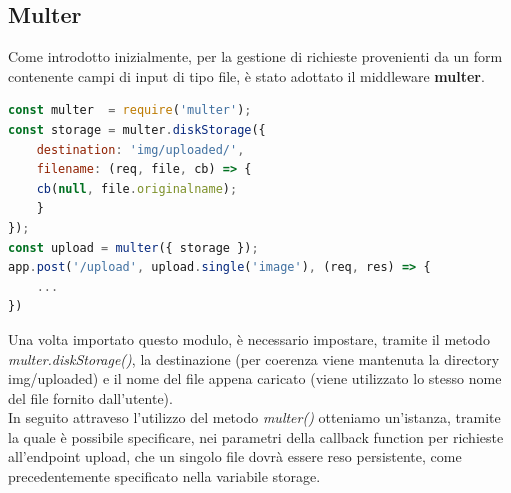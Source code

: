 \subsection{Multer}
Come introdotto inizialmente, per la gestione di richieste provenienti da un form contenente campi di input di tipo file, è stato adottato il middleware \textbf{multer}.
\begin{lstlisting}[language=Javascript, caption={Configurazione upload immagine}, showstringspaces=false]
const multer  = require('multer');
const storage = multer.diskStorage({
    destination: 'img/uploaded/',
    filename: (req, file, cb) => {
    cb(null, file.originalname);
    }
});
const upload = multer({ storage });
app.post('/upload', upload.single('image'), (req, res) => {
    ...
})
\end{lstlisting}
Una volta importato questo modulo, è necessario impostare, tramite il metodo \emph{multer.diskStorage()}, la destinazione (per coerenza viene mantenuta la directory img/uploaded) e il nome del file appena caricato (viene utilizzato lo stesso nome del file fornito dall'utente).
\\In seguito attraveso l'utilizzo del metodo \emph{multer()} otteniamo un'istanza, tramite la quale è possibile specificare, nei parametri della callback function per richieste all'endpoint upload, che un singolo file dovrà essere reso persistente, come precedentemente specificato nella variabile storage.
